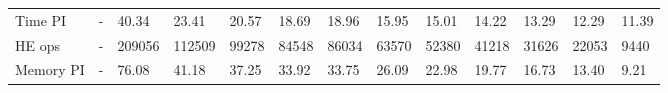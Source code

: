 \begin{table}
\begin{tabular}{lllllllllllll}
Time PI   &           - &            40.34 &             23.41 &             20.57 &             18.69 &             18.96 &             15.95 &             15.01 &             14.22 &             13.29 &            12.29 &            11.39 \\
HE ops    &           - &           209056 &            112509 &             99278 &             84548 &             86034 &             63570 &             52380 &             41218 &             31626 &            22053 &             9440 \\
Memory PI &           - &            76.08 &             41.18 &             37.25 &             33.92 &             33.75 &             26.09 &             22.98 &             19.77 &             16.73 &            13.40 &             9.21 \\
\bottomrule
\end{tabular}
\end{table}

